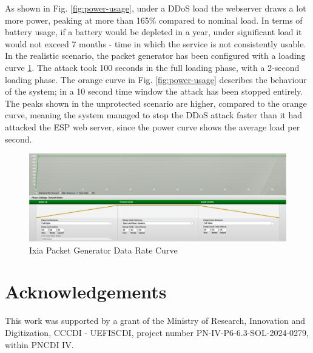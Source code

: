 \documentclass[conference]{IEEEtran}
\begin{document}
As shown in Fig. \ref{fig:power-usage}, under a DDoS load the webserver draws a lot more power, peaking at more than 165\% compared to nominal load. In terms of battery usage, if a battery would be depleted in a year, under significant load it would not exceed 7 months - time in which the service is not consistently usable.
\\
In the realistic scenario, the packet generator has been configured with a loading curve \ref{fig:data-rate}. The attack took 100 seconds in the full loading phase, with a 2-second loading phase. The orange curve in Fig. \ref{fig:power-usage} describes the behaviour of the system; in a 10 second time window the attack has been stopped entirely. The peaks shown in the unprotected scenario are higher, compared to the orange curve, meaning the system managed to stop the DDoS attack faster than it had attacked the ESP web server, since the power curve shows the average load per second.
\\
\begin{figure}
    \centering
    \includegraphics[width=1.03\linewidth]{images/breakingpoint_curve.png}
    \caption{Ixia Packet Generator Data Rate Curve}
    \label{fig:data-rate}
\end{figure}

\section{Acknowledgements}
This work was supported by a grant of the Ministry of Research, Innovation and Digitization, CCCDI - UEFISCDI, project number PN-IV-P6-6.3-SOL-2024-0279, within PNCDI IV.



\vspace{12pt}
\end{document}
